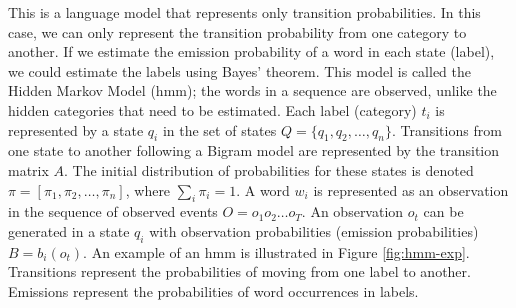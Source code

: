 \documentclass{KBook}
\begin{document}

This is a language model that represents only transition probabilities. In this case, we can only represent the transition probability from one category to another. If we estimate the emission probability of a word in each state (label), we could estimate the labels using Bayes' theorem. This model is called the Hidden Markov Model (\ac{hmm}); the words in a sequence are observed, unlike the hidden categories that need to be estimated. Each label (category) $t_i$ is represented by a state $q_i$ in the set of states $Q = \{q_1, q_2, \ldots, q_n\}$. Transitions from one state to another following a Bigram model are represented by the transition matrix $A$. The initial distribution of probabilities for these states is denoted $\pi = [\pi_1, \pi_2, \ldots, \pi_n]$, where $\sum_i \pi_i = 1$. A word $w_i$ is represented as an observation in the sequence of observed events $O = o_1 o_2 \ldots o_T$. An observation $o_t$ can be generated in a state $q_i$ with observation probabilities (emission probabilities) $B = b_i(o_t)$. An example of an \ac{hmm} is illustrated in Figure \ref{fig:hmm-exp}. Transitions represent the probabilities of moving from one label to another. Emissions represent the probabilities of word occurrences in labels.
\end{document}
